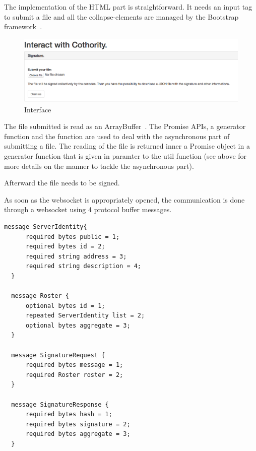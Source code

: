 \documentclass[11pt, a4paper, twoside, openright, openany]{article} %
\begin{document}
The implementation of the HTML part is straightforward. It needs an input tag to
submit a file and all the collapse-elements are managed by the Bootstrap framework~\cite{bootstrap}.
\bigbreak

\begin{figure}[ht!]
\centering
\includegraphics[width=125mm]{verification_signature.jpg}
\caption{Interface}
\end{figure}
\leavevmode \newline

The file submitted is read as an ArrayBuffer~\cite{ArrayBuffer}. The Promise APIs,
a generator function and the  function are used to deal with
the asynchronous part of submitting a file. The reading of the file is returned
inner a Promise object in a generator function that is given in paramter to the
 util function (see above for more details on
the manner to tackle the asynchronous part). %
\bigbreak

Afterward the file needs to be signed.
\newline

As soon as the websocket is appropriately opened, the communication is done through a websocket
using 4 protocol buffer messages.
\bigbreak

\begin{lstlisting}[caption={.proto file}, captionpos=b]
  message ServerIdentity{
      required bytes public = 1;
      required bytes id = 2;
      required string address = 3;
      required string description = 4;
  }

  message Roster {
      optional bytes id = 1;
      repeated ServerIdentity list = 2;
      optional bytes aggregate = 3;
  }

  message SignatureRequest {
      required bytes message = 1;
      required Roster roster = 2;
  }

  message SignatureResponse {
      required bytes hash = 1;
      required bytes signature = 2;
      required bytes aggregate = 3;
  }
\end{lstlisting}
\leavevmode \newline
\end{document}
